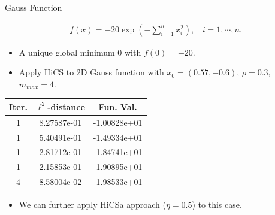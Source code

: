 \documentclass{beamer}
\newcommand{\bmx}{x}
\begin{document}
\begin{frame}{Gauss Function}
\footnotesize{
\begin{align*}
	f(\bmx) = -20 \exp\left( -\sum_{i=1}^n x_i^2 \right),
	~~ ~~i=1,\cdots,n.
\end{align*}
\begin{itemize}
	\item A unique global minimum $0$ with $f(0)=-20$.
\end{itemize}
}
\pause
\footnotesize{
	\begin{itemize}
		\item Apply HiCS to 2D Gauss function with $x_0 = (0.57, -0.6)$,
			$\rho=0.3$, $m_{max}=4$.
\end{itemize}
}
\vspace{-0.2cm}
\begin{table}[!htbp]
\begin{center}
\footnotesize{
\begin{tabular}{|c|c|c|}
 \hline
    Iter. & $\ell^2$-distance &  Fun. Val.
 \\\hline
  1 & 8.27587e-01 & -1.00828e+01
 \\ \hline                                                                                                                                       
  1 & 5.40491e-01 & -1.49334e+01
  \\ \hline  
  1 & 2.81712e-01 & -1.84741e+01  
    \\ \hline  
  1 & 2.15853e-01 & -1.90895e+01  
    \\ \hline  
  4 & 8.58004e-02 & -1.98533e+01  
 \\\hline
\end{tabular}
}
\end{center}
\end{table}
\vspace{-0.3cm}
\pause
\footnotesize{
	\begin{itemize}
		\item We can further apply HiCSa approach ($\eta=0.5$) to this case.
	\end{itemize}
\vspace{-0.1cm}
}
\end{frame}
\end{document}
